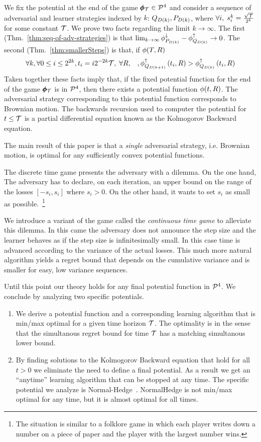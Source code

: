 \documentclass{article}[12pt]
\begin{document}
We fix the potential at the end of the game $\pmb{\phi}_{\mathcal{T}} \in {\cal P}^{4}$
and consider a sequence of adversarial and learner strategies indexed
by $k$: $Q_{D(k)},P_{D(k)}$, where
$\forall i,\; s^k_i = \frac{\sqrt{\mathcal{T}}}{2^k}$ for some constant
$\mathcal{T}$. We prove two facts regarding the limit $k \to \infty$.  The
first (Thm.~\ref{thm:seq-of-adv-strategies}) is that
$\lim_{k \to \infty}\phi_{P_{D(k)}}^{\downarrow} - \phi_{Q_{D(k)}}^{\uparrow} \to 0$.  The second
(Thm.~\ref{thm:smallerSteps}) is that, if $\phi(T,R)$
$$\forall k, \forall 0\leq i \leq 2^{2k},t_i=i 2^{-2k} \mathcal{T},\; \forall R,\;\;\;
,\phi_{Q_{D(k+1)}}^{\uparrow}\left(t_i,R\right) >
\phi_{Q_{D(k)}}^{\uparrow}\left(t_i,R\right)$$ Taken together these facts imply
that, if the fixed potential function for the end of the game
$\pmb{\phi}_{\mathcal{T}}$ is in ${\cal P}^{4}$, then there exists a potential function
$\phi(t,R)$. The adversarial strategy corresponding to this potential
function corresponds to Brownian motion.  The backwards recursion used
to computer the potential for $t \leq \mathcal{T}$ is a partial
differential equation known as the Kolmogorov Backward equation.

The main result of this paper is that a {\em single} adversarial
strategy, i.e. Brownian motion, is optimal for any
sufficiently convex potential functions.

The discrete time game presents the adversary with a dilemma.  On the
one hand, The adversary has to declare, on each iteration, an upper bound on the
range of the losses $[-s_i,s_i]$ where $s_i>0$. On the other hand, it
wants to set $s_i$ as small as possible.~\footnote{The situation is
  similar to a folklore game in which each player writes down a number
  on a piece of paper and the player with the largest number wins.}

We introduce a variant of the game called the {\em continuous time
  game} to alleviate this dilemma. In this came the adversary does not
announce the step size and the learner behaves as if
the step size is infinitesimally small. In this case time is advanced according
to the variance of the actual losses. This much more natural algorithm yields
a regret bound that depends on the cumulative variance and is smaller
for easy, low variance sequences.

Until this point our theory holds for any final potential function in ${\cal P}^{4}$. We conclude by analyzing two specific potentials.
\begin{enumerate}
\item We derive a potential function and a corresponding learning algorithm
  that is min/max optimal for a given time horizon $\mathcal{T}$.
  The optimality is in the sense that the
  simultanous regret bound for time $\mathcal{T}$ has a matching
  simultanous lower bound.
\item By finding solutions to the Kolmogorov Backward equation that
  hold for all $t>0$ we eliminate the need to define a final
  potential. As a result we get an ``anytime'' learning algorithm that
  can be stopped at any time. The specific potential we analyze is
  Normal-Hedge~\cite{}. NormalHedge is not min/max optimal for any
  time, but it is almost optimal for all times.
\end{enumerate}
\end{document}
